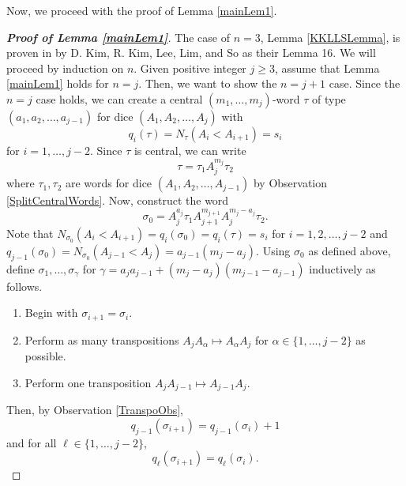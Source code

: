 \documentclass[11pt]{article}
\theoremstyle{definition}
\begin{document}
Now, we proceed with the proof of Lemma \ref{mainLem1}.
\begin{proof}[\bf{Proof of Lemma \ref{mainLem1}}]
    The case of $n=3$, Lemma \ref{KKLLSLemma}, is proven in \cite{KKLLS2024} by D. Kim, R. Kim, Lee, Lim, and So as their Lemma 16. We will proceed by induction on $n$. Given positive integer $j \geq 3$, assume that Lemma \ref{mainLem1} holds for $n=j$. Then, we want to show the $n=j+1$ case. Since the $n=j$ case holds, we can create a central $(m_1,\dots, m_j)$-word $\tau$ of type $(a_1,a_2,\dots,a_{j-1})$ for dice $(A_1,A_2,\dots, A_j)$ with
    $$q_i(\tau) = N_\tau(A_i<A_{i+1}) = s_i$$
    for $i = 1,\dots,j-2$.
    Since $\tau$ is central, we can write
    $$\tau = \tau_1 A_j^{m_j} \tau_2$$
    where $\tau_1,\tau_2$ are words for dice $(A_1,A_2,\dots, A_{j-1})$ by Observation \ref{SplitCentralWords}. Now, construct the word
    $$\sigma_0 = A_j^{a_j} \tau_1 A_{j+1}^{m_{j+1}} A_j^{m_j-a_j} \tau_2.$$
    Note that $N_{\sigma_0}(A_i<A_{i+1}) = q_{i}(\sigma_0) = q_i(\tau) = s_i$ for $i = 1,2,\dots, j-2$ and $q_{j-1}(\sigma_0) = N_{\sigma_0}(A_{j-1}<A_j) = a_{j-1}(m_j-a_j)$.
    Using $\sigma_0$ as defined above, define $\sigma_1,\dots,\sigma_{\gamma}$ for $\gamma = a_ja_{j-1} + (m_j-a_j)(m_{j-1}-a_{j-1})$ inductively as follows.
    \begin{enumerate}
        \item Begin with $\sigma_{i+1} = \sigma_i$.
        \item Perform as many transpositions $A_{j}A_{\alpha} \mapsto A_\alpha A_j$ for $\alpha \in \{ 1,\dots,j-2\}$ as possible.
        \item Perform one transposition $A_{j}A_{j-1} \mapsto A_{j-1}A_j$.
    \end{enumerate}
    Then, by Observation \ref{TranspoObs},
    $$q_{j-1}(\sigma_{i+1}) = q_{j-1}(\sigma_i)+1$$
    and for all $\ell \in \{1,\dots,j-2\}$,
    $$q_{\ell}(\sigma_{i+1}) = q_{\ell}(\sigma_i).$$
    

\end{proof}
\end{document}
